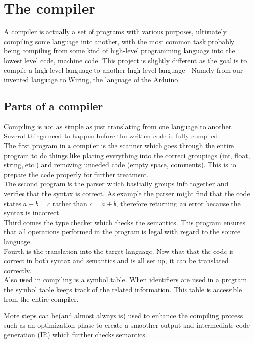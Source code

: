 \section{The compiler}
A compiler is actually a set of programs with various purposes, ultimately compiling some language into another, with the most common task probably being compiling from some kind of high-level programming language into the lowest level code, machine code. This project is slightly different as the goal is to compile a high-level language to another high-level language - Namely from our invented language to Wiring, the language of the Arduino.
\subsection{Parts of a compiler}
Compiling is not as simple as just translating from one language to another. Several things need to happen before the written code is fully compiled.\\
The first program in a compiler is the scanner which goes through the entire program to do things like placing everything into the correct groupings (int, float, string, etc.) and removing unneded code (empty space, comments). This is to prepare the code properly for further treatment.\\
The second program is the parser which basically groups info together and verifies that the syntax is correct. As example the parser might find that the code states $a + b = c$ rather than $c = a + b$, therefore returning an error because the syntax is incorrect.\\
Third comes the type checker which checks the semantics. This program ensures that all operations performed in the program is legal with regard to the source language.\\
Fourth is the translation into the target language. Now that that the code is correct in both syntax and semantics and is all set up, it can be translated correctly.\\

Also used in compiling is a symbol table. When identifiers are used in a program the symbol table keeps track of the related information. This table is accessible from the entire compiler.

More steps can be(and almost always is) used to enhance the compiling process such as an optimization phase to create a smoother output and intermediate code generation (IR) which further checks semantics.